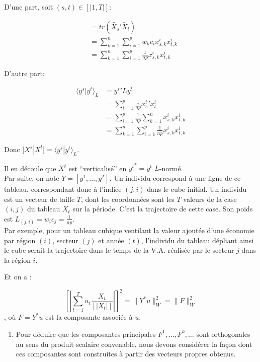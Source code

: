 \documentclass[
]{article}
\providecommand{\tightlist}{%
  \setlength{\itemsep}{0pt}\setlength{\parskip}{0pt}}
\begin{document}
D'une part, soit \((s,t) \in [|1,T|]\):

\begin{align*}
[X_s \mid X_t] &= tr(\tilde{X_s}'\tilde{X_t})\\
&= \sum_{k=1}^{n} \sum_{i=1}^{p} w_k c_i x^i_{s,k} x^i_{t,k}\\
&= \sum_{k=1}^{n} \sum_{i=1}^{p} \frac{1}{np} x^i_{s,k} x^i_{t,k}
\end{align*}

D'autre part:

\begin{align*}
\langle y^s | y^t \rangle_L &= {y^{s}}'L y^{t} \\
&= \sum_{i=1}^{p} \frac{1}{np} {x^i_{s}}' x^i_{t}\\
&= \sum_{i=1}^{p} \frac{1}{np} \sum_{k=1}^{n} x^i_{s,k} x^i_{t,k}\\
&= \sum_{k=1}^{n} \sum_{i=1}^{p} \frac{1}{np} x^i_{s,k} x^i_{t,k}
\end{align*}

Donc \([ X^s | X^t ] = \langle y^s | y^t \rangle_L\).

Il en découle que \(X^t\) est ``verticalisé'' en \({y^t}^* = y^t\)
\(L\)-normé.\\

Par suite, on note \(Y = [ y^1, \ldots , y^T ]\). Un individu correspond
à une ligne de ce tableau, correspondant donc à l'indice \((j,i)\) dans
le cube initial. Un individu est un vecteur de taille \(T\), dont les
coordonnées sont les \(T\) valeurs de la case \((i,j)\) du tableau
\(X_t\) sur la période. C'est la trajectoire de cette case. Son poids
est \(L_(j,i) = w_i c_j = \frac{1}{np}\).\\

Par exemple, pour un tableau cubique ventilant la valeur ajoutée d'une
économie par région \((i)\), secteur \((j)\) et année \((t)\),
l'individu du tableau dépliant ainsi le cube serait la trajectoire dans
le temps de la V.A. réalisée par le secteur \(j\) dans la région \(i\).

Et on a :

\[ \left[\left| \sum_{t=1}^{T} u_t \frac{X_t}{\left[\left| X_t \right|\right]} \right|\right]^2 = \| Y^* u \|_{W}^{2} = \| F \|_{W}^{2} \],
où \(F = Y^* u\) est la composante associée à \(u\).

\begin{enumerate}
\def\labelenumi{\alph{enumi})}
\setcounter{enumi}{1}
\tightlist
\item
  Pour déduire que les composantes principales
  \(F^1, \ldots, F^k, \ldots\) sont orthogonales au sens du produit
  scalaire convenable, nous devons considérer la façon dont ces
  composantes sont construites à partir des vecteurs propres obtenus.
\end{enumerate}
\end{document}
